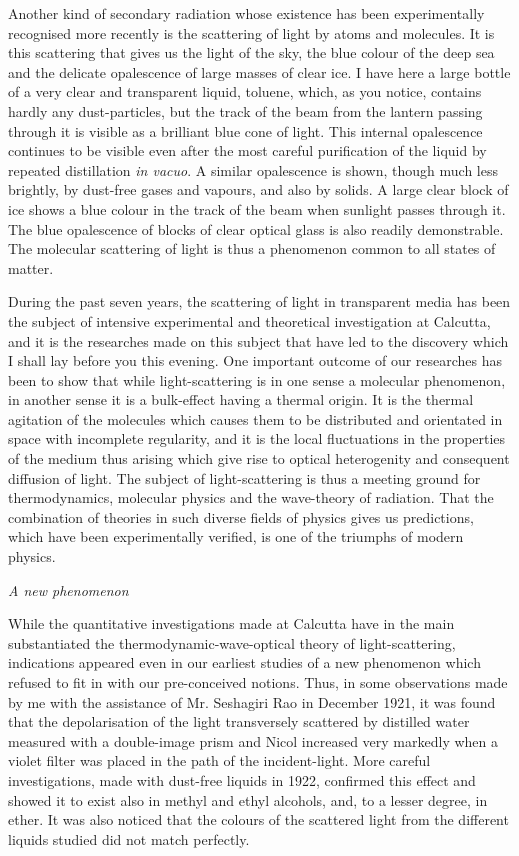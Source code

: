 Another kind of secondary radiation whose existence has been experimentally recognised more recently is the scattering of light by atoms and molecules. It is this scattering that gives us the light of the sky, the blue colour of the deep sea and the delicate opalescence of large masses of clear ice. I have here a large bottle of a very clear and transparent liquid, toluene, which, as you notice, contains hardly any dust-particles, but the track of the beam from the lantern passing through it is visible as a brilliant blue cone of light. This internal opalescence continues to be visible even after the most careful purification of the liquid by repeated distillation {\em in vacuo}. A similar opalescence is shown, though much less brightly, by dust-free gases and vapours, and also by solids. A large clear block of ice shows a blue colour in the track of the beam when sunlight passes through it. The blue opalescence of blocks of clear optical glass is also readily demonstrable. The molecular scattering of light is thus a phenomenon common to all states of matter.

\eject

During the past seven years, the scattering of light in transparent media has been the subject of intensive experimental and theoretical investigation at Calcutta, and it is the researches made on this subject that have led to the discovery which I shall lay before you this evening. One important outcome of our researches has been to show that while light-scattering is in one sense a molecular phenomenon, in another sense it is a bulk-effect having a thermal origin. It is the thermal agitation of the molecules which causes them to be distributed and orientated in space with
incomplete regularity, and it is the local fluctuations in the properties of the medium thus arising which give rise to optical heterogenity and consequent diffusion of light. The subject of light-scattering is thus a meeting ground for thermodynamics, molecular physics and the wave-theory of radiation. That the combination of theories in such diverse fields of physics gives us predictions, which have been experimentally verified, is one of the triumphs of modern physics.

\medskip
\noindent
{\em A new phenomenon}
\smallskip

While the quantitative investigations made at Calcutta have in the main substantiated the thermodynamic-wave-optical theory of light-scattering, indications appeared even in our earliest studies of a new phenomenon which refused to fit in with our pre-conceived notions. Thus, in some observations made by me with the assistance of Mr. Seshagiri Rao in December 1921, it was found that the depolarisation of the light transversely scattered by distilled water measured with a double-image prism and Nicol increased very markedly when a violet filter was placed in the path of the incident-light. More careful investigations, made with dust-free liquids in 1922, confirmed this effect and showed it to exist also in methyl and ethyl alcohols, and, to a lesser degree, in ether. It was also noticed that the colours of the scattered light from the different liquids studied did not match perfectly.


